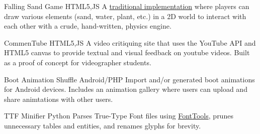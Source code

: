  {Falling Sand Game} {HTML5,JS} {
    A \href {https://en.wikipedia.org/wiki/Falling-sand_game} {traditional implementation} where players can draw various elements (sand, water, plant, etc.) in a 2D world to interact with each other with a crude, hand-written, physics engine.
}

 {CommenTube} {HTML5,JS} {
    A video critiquing site that uses the YouTube API and HTML5 canvas to provide textual and visual feedback on youtube videos. Built as a proof of concept for videographer students.
}

 {Boot Animation Shuffle} {Android/PHP} {
    Import and/or generated boot animations for Android devices. Includes an animation gallery where users can upload and share animtations with other users.
}

\personalProject {} {TTF Minifier} {Python} {
    Parses True-Type Font files using \href {https://github.com/fonttools/fonttools} {FontTools}, prunes unnecessary tables and entities, and renames glyphs for brevity.
}